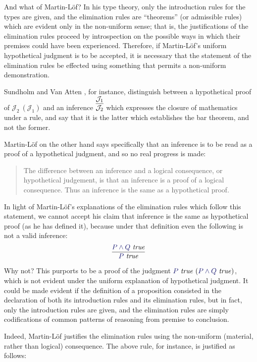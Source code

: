 \documentclass[11pt]{amsart}
\theoremstyle{definition}
\theoremstyle{remark}
\numberwithin{equation}{section}
\def\InputModeColorName{MidnightBlue}
\newcommand\InputMode[1]{{\color{\InputModeColorName}{#1}}}
\newcommand\HypJ[2]{#1\ (#2)}
\newcommand\JJ{\mathcal{J}}
\newcommand\IsTrue[1]{\InputMode{#1}\ \mathit{true}}
\begin{document}
And what of Martin-L\"of? In his type theory, only the introduction rules for
the types are given, and the elimination rules are ``theorems'' (or admissible
rules) which are evident only in the non-uniform sense; that is, the
justifications of the elimination rules proceed by introspection on the possible
ways in which their premises could have been experienced. Therefore, if
Martin-L\"of's uniform hypothetical judgment is to be accepted, it is necessary
that the statement of the elimination rules be effected using something that
permits a non-uniform demonstration.

Sundholm and Van Atten \cite{sundholm-mva}, for instance, distinguish between a
hypothetical proof of $\HypJ{\JJ_2}{\JJ_1}$ and an inference
$\infer{\JJ_2}{\JJ_1}$ which expresses the closure of mathematics under a rule,
and say that it is the latter which establishes the bar theorem, and not
the former.

Martin-L\"of on the other hand says specifically that an inference is to be read
as a proof of a hypothetical judgment, and so no real progress is made:
\begin{quote}
  The difference between an inference and a logical consequence, or hypothetical
  judgement, is that an inference is a proof of a logical consequence. Thus an
  inference is the same as a hypothetical proof. \cite{siena.lectures}
\end{quote}

In light of Martin-L\"of's explanations of the elimination rules which follow
this statement, we cannot accept his claim that inference is the same as
hypothetical proof (as he has defined it), because under that definition even
the following is not a valid inference:
\[
  \infer{
    \IsTrue{P}
  }{
    \IsTrue{P\land Q}
  }
\]

Why not? This purports to be a proof of the judgment
$\HypJ{\IsTrue{P}}{\IsTrue{P\land Q}}$, which is not evident under the uniform
explanation of hypothetical judgment. It could be made evident if the definition
of a proposition consisted in the declaration of both its introduction rules and
its elimination rules, but in fact, only the introduction rules are given, and
the elimination rules are simply codifications of common patterns of reasoning
from premise to conclusion.

Indeed, Martin-L\"of justifies the elimination rules using the non-uniform
(material, rather than logical) consequence. The above rule, for instance, is
justified as follows:
\end{document}
